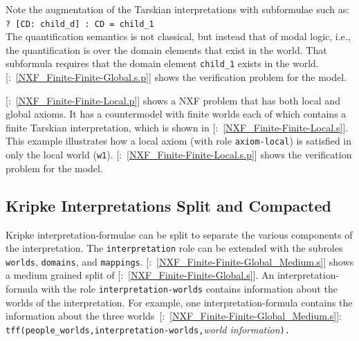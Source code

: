 \documentclass{ceurart}
\newcommand{\smalltt}[1]{\small \texttt{#1}}
\newcommand{\example}{{\scriptsize \faFile[regular]}}
\begin{document}
Note the augmentation of the Tarskian interpretations with subformulae such as:\\
\hspace*{0.5cm}\smalltt{?\,[CD:\,child\_d]\,:\,CD\,=\,child\_1}\\
The quantification semantics is not classical, but instead that of modal logic, i.e., the 
quantification is over the domain elements that exist in the world.
That subformula requires that the domain element \smalltt{child\_1} exists in the world.
[\example{}:~\ref{NXF_Finite-Finite-Global.s.p}] shows the verification problem for the model.

[\example{}:~\ref{NXF_Finite-Finite-Local.p}] shows a NXF problem 
that has both local and global axioms.
It has a countermodel with finite worlds each of which contains a finite Tarskian interpretation, 
which is shown in [\example{}:~\ref{NXF_Finite-Finite-Local.s}].
This example illustrates how a local axiom (with role \smalltt{axiom-local}) is satisfied in 
only the local world (\smalltt{w1}).
[\example{}:~\ref{NXF_Finite-Finite-Local.s.p}] shows the verification 
problem for the model.

\subsection{Kripke Interpretations Split and Compacted}
\label{NewKripkeSplitCompact}

Kripke interpretation-formulae can be split to separate the various components of the 
interpretation.
The \smalltt{interpretation} role can be extended with the subroles \smalltt{worlds},
\smalltt{domains}, and \smalltt{mappings}.
[\example{}:~\ref{NXF_Finite-Finite-Global_Medium.s}] shows a medium 
grained split of [\example{}:~\ref{NXF_Finite-Finite-Global.s}].
An interpretation-formula with the role \smalltt{interpretation-worlds} contains information about 
the worlds of the interpretation.
For example, one interpretation-formula contains the information about the three 
worlds~[\example{}:~\ref{NXF_Finite-Finite-Global_Medium.s}]: \\
\hspace*{0.5cm}\smalltt{tff(people\_worlds,interpretation-worlds,}\emph{world information}\smalltt{).}
\end{document}
